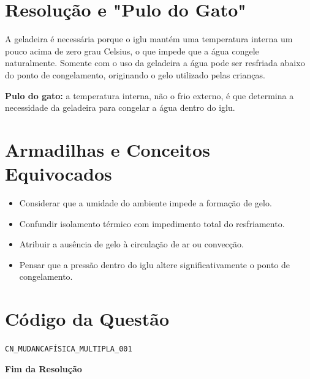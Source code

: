 \documentclass{article}
\begin{document}
\section*{Resolução e "Pulo do Gato"}

A geladeira é necessária porque o iglu mantém uma temperatura interna um pouco acima de zero grau Celsius, o que impede que a água congele naturalmente. Somente com o uso da geladeira a água pode ser resfriada abaixo do ponto de congelamento, originando o gelo utilizado pelas crianças.

\textbf{Pulo do gato:} a temperatura interna, não o frio externo, é que determina a necessidade da geladeira para congelar a água dentro do iglu.

\section*{Armadilhas e Conceitos Equivocados}

\begin{itemize}
  \item Considerar que a umidade do ambiente impede a formação de gelo.
  \item Confundir isolamento térmico com impedimento total do resfriamento.
  \item Atribuir a ausência de gelo à circulação de ar ou convecção.
  \item Pensar que a pressão dentro do iglu altere significativamente o ponto de congelamento.
\end{itemize}

\section*{Código da Questão}

\texttt{CN\_MUDANCAFÍSICA\_MULTIPLA\_001}

\bigskip

\begin{center}
\textbf{Fim da Resolução}
\end{center}
\end{document}
